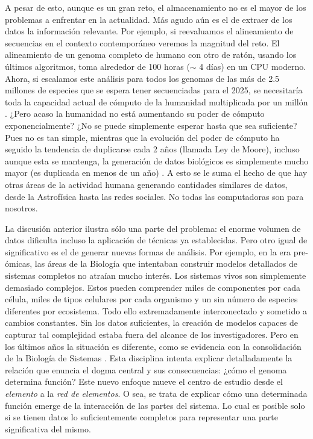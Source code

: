 A pesar de esto, aunque es un gran reto, el almacenamiento no es el mayor de los problemas a enfrentar en la actualidad.
Más agudo aún es el de extraer de los datos la información relevante.
Por ejemplo, si reevaluamos el alineamiento de secuencias en el contexto contemporáneo veremos la magnitud del reto.
El alineamiento de un genoma completo de humano con otro de ratón, usando los últimos algoritmos, toma alrededor de 100 horas ($\sim$ 4 días) en un CPU moderno.
Ahora, si escalamos este análisis para todos los genomas de las más de 2.5 millones de especies que se espera tener secuenciadas para el 2025, se necesitaría toda la capacidad actual de cómputo de la humanidad multiplicada por un millón \cite{stephensBigDataAstronomical2015}.
¿Pero acaso la humanidad no está aumentando su poder de cómputo exponencialmente? ¿No se puede simplemente esperar hasta que sea suficiente?
Pues no es tan simple, mientras que la evolución del poder de cómputo ha seguido la tendencia de duplicarse cada 2 años (llamada Ley de Moore), incluso aunque esta se mantenga, la generación de datos biológicos es simplemente mucho mayor (es duplicada en menos de un año) \cite{stephensBigDataAstronomical2015}.
A esto se le suma el hecho de que hay otras áreas de la actividad humana generando cantidades similares de datos, desde la Astrofísica hasta las redes sociales.
No todas las computadoras son para nosotros.

La discusión anterior ilustra sólo una parte del problema: el enorme volumen de datos dificulta incluso la aplicación de técnicas ya establecidas.
Pero otro igual de significativo es el de generar nuevas formas de análisis.
Por ejemplo, en la era pre-ómicas, las áreas de la Biología que intentaban construir modelos detallados de sistemas completos no atraían mucho interés.
Los sistemas vivos son simplemente demasiado complejos.
Estos pueden comprender miles de componentes por cada célula, miles de tipos celulares por cada organismo y un sin número de especies diferentes por ecosistema.
Todo ello extremadamente interconectado y sometido a cambios constantes.
Sin los datos suficientes, la creación de modelos capaces de capturar tal complejidad estaba fuera del alcance de los investigadores.
Pero en los últimos años la situación es diferente, como se evidencia con la consolidación de la Biología de Sistemas \cite{likicSystemsBiologyNext2010a}.
Esta disciplina intenta explicar detalladamente la relación que enuncia el dogma central y sus consecuencias:
¿cómo el genoma determina función?
Este nuevo enfoque mueve el centro de estudio desde el \textit{elemento} a la \textit{red de elementos}.
O sea, se trata de explicar cómo una determinada función emerge de la interacción de las partes del sistema.
Lo cual es posible  solo si se tienen datos lo suficientemente completos para representar una parte significativa del mismo.


